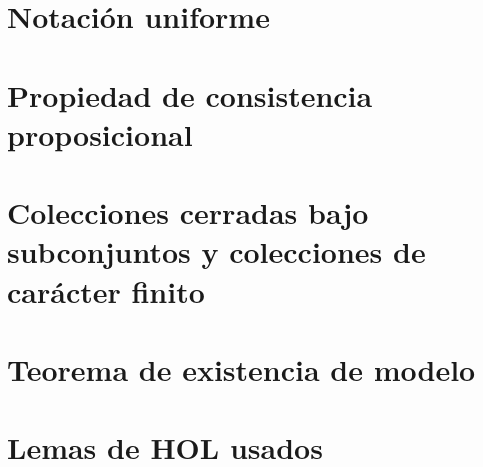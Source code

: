 \documentclass[12pt,a4paper,twoside]{book}
\begin{document}
\chapter{Notación uniforme}


\chapter{Propiedad de consistencia proposicional}


\chapter{Colecciones cerradas bajo subconjuntos y colecciones de carácter finito}


\chapter{Teorema de existencia de modelo}


\appendix
\chapter{Lemas de HOL usados}


\nocite{fitting1996first,LMF,CC,articulo,escribir,tutorial,main,isar,implementation,intro,gamut,modal,proofsystems,automatic,coq}


\end{document}

